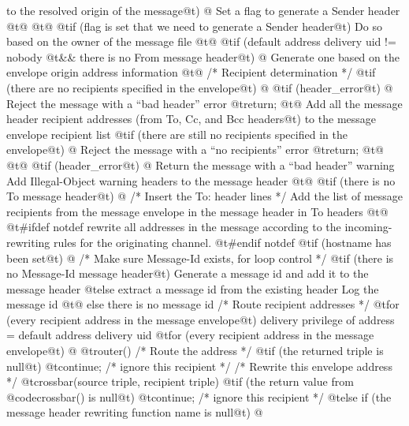{{{{{                to the resolved origin of the message@t{) @{}
                Set a flag to generate a Sender header
            @t{@}}
        @t{@}}
        @t{if (}flag is set that we need to generate a Sender header@t{)}
            Do so based on the owner of the message file
    @t{@}}
    @t{if (}default address delivery uid != nobody
        @t{&&} there is no From message header@t{) @{}
        Generate one based on the envelope origin address information
    @t{@}}
    /* Recipient determination */
    @t{if (}there are no recipients specified in the envelope@t{) @{}
        @t{if (}header_error@t{) @{}
            Reject the message with a ``bad header'' error
            @t{return;}
        @t{@}}
        Add all the message header recipient addresses (from To, Cc,
            and Bcc headers@t{)} to the message envelope recipient list
        @t{if (}there are still no recipients specified in the envelope@t{) @{}
            Reject the message with a ``no recipients'' error
            @t{return;}
        @t{@}}
    @t{@}}
    @t{if (}header_error@t{) @{}
        Return the message with a ``bad header'' warning
        Add Illegal-Object warning headers to the message header
    @t{@}}
    @t{if (}there is no To message header@t{) @{}
        /* Insert the To: header lines */
        Add the list of message recipients from the message envelope
            in the message header in To headers
    @t{@}}
@t{#ifdef notdef}
    rewrite all addresses in the message according to the incoming-rewriting
        rules for the originating channel.
@t{#endif notdef}
    @t{if (}hostname has been set@t{) @{}
        /* Make sure Message-Id exists, for loop control */
        @t{if (}there is no Message-Id message header@t{)}
            Generate a message id and add it to the message header
        @t{else}
            extract a message id from the existing header
        Log the message id
    @t{@} else}
        there is no message id
    /* Route recipient addresses */
    @t{for (}every recipient address in the message envelope@t{)}
        delivery privilege of address = default address delivery uid
    @t{for (}every recipient address in the message envelope@t{) @{}
        @t{router()}    /* Route the address */
        @t{if (}the returned triple is null@t{)}
            @t{continue;}    /* ignore this recipient */
        /* Rewrite this envelope address */
        @t{crossbar(source triple, recipient triple)}
        @t{if (}the return value from @code{crossbar()} is null@t{)}
            @t{continue;}    /* ignore this recipient */
        @t{else if (}the message header rewriting function name is null@t{) @{}
}}}}}
